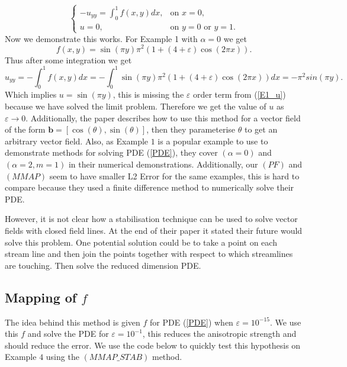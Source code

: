 \documentclass[12pt]{ociamthesis}
\begin{document}
\begin{equation}
\begin{cases}
-u_{yy} =\int_0^1 f(x, y) dx, &\text{on } x=0,\\
u = 0, &\text{on } y=0 \text{ or } y=1.
\end{cases}
\end{equation}
Now we demonstrate this works. For Example 1 with $\alpha = 0$ we get 
\begin{equation}
f(x,y) = \sin(\pi y)\pi^2(1+(4+\varepsilon)\cos(2\pi x)) .
\end{equation}
Thus after some integration we get
\begin{equation}
u_{yy} = - \int_0^1 f(x,y)dx = - \int_0^1 \sin(\pi y)\pi^2(1+(4+\varepsilon)\cos(2\pi x)) dx = -\pi^2 sin(\pi y).
\end{equation}
Which implies $u= \sin(\pi y)$, this is missing the $\varepsilon$ order term from (\ref{E1_u}) because we have solved the limit problem. Therefore we get the value of $u$ as $\varepsilon \rightarrow 0$. Additionally, the paper \cite{LINE_INT} describes how to use this method for a vector field of the form $\mathbf{b} = [\cos(\theta), \sin(\theta)]$, then they parameterise $\theta$ to get an arbitrary vector field. Also, as Example $1$ is a popular example to use to demonstrate methods for solving PDE (\ref{PDE}), they cover $(\alpha = 0)$ and $(\alpha=2, m=1)$ in their numerical demonstrations. Additionally, our $(PF)$ and $(MMAP)$ seem to have smaller L2 Error for the same examples, this is hard to compare because they used a finite difference method to numerically solve their PDE.
 
 However, it is not clear how a stabilisation technique can be used to solve vector fields with closed field lines. At the end of their paper it stated their future would solve this problem. One potential solution could be to take a point on each stream line and then join the points together with respect to which streamlines are touching. Then solve the reduced dimension PDE.

\subsection{Mapping of $f$} \label{MAP_f}
The idea behind this method is given $f$ for PDE (\ref{PDE}) when $\varepsilon = 10^{-15}$. We use this $f$ and solve the PDE for $\varepsilon = 10^{-1}$, this reduces the anisotropic strength and should reduce the error. We use the code below to quickly test this hypothesis on Example $4$ using the $(MMAP\_STAB)$ method.
\end{document}
